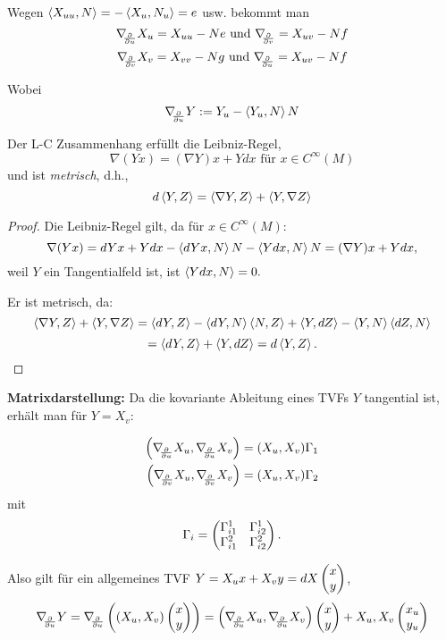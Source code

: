 \begin{remark}
	
	Wegen $ \left \langle X_{uu},N \right\rangle= -\left \langle X_u,N_u \right\rangle= e $ usw. bekommt man 
		\[ \nabla_{\!\!{\partial\over \partial u}}X_u = X_{uu}-Ne \text{ und } \nabla_{\!\!{\partial\over \partial v}} = X_{uv}-Nf \]
		\[ \nabla_{\!\!{\partial\over \partial v}}X_v = X_{vv}-Ng \text{ und } \nabla_{\!\!{\partial\over \partial u}} = X_{uv}-Nf \]
	
	Wobei $$ \nabla_{\!\!{\partial\over \partial u}}Y := Y_u - \left \langle Y_u,N \right\rangle N $$
	
\end{remark}

\begin{lemma}
	
	Der L-C Zusammenhang erfüllt die Leibniz-Regel,
		\[ \nabla(Yx) = (\nabla Y)x + Ydx \text{ für } x \in C^\infty(M) \] 
	und ist \emph{metrisch}, d.h., 
		\[ d\left \langle Y,Z \right\rangle = \left \langle \nabla Y,Z \right\rangle + \left \langle Y,\nabla Z \right\rangle \]
	
\end{lemma}

\begin{proof}
	
	Die Leibniz-Regel gilt, da für $x \in C^\infty(M)$:
		\[ \nabla(Yx) = dYx + Ydx- \left \langle dYx,N \right\rangle N - \left \langle Ydx,N \right\rangle N = (\nabla Y)x + Ydx, \]
	weil $ Y $ ein Tangentialfeld ist, ist $ \left \langle Ydx,N \right\rangle = 0. $ 
	
	Er ist metrisch, da:
		\[  \left \langle \nabla Y,Z \right\rangle + \left \langle Y,\nabla Z \right\rangle = \left \langle dY,Z \right\rangle -\left \langle dY,N \right\rangle\left \langle N,Z \right\rangle + \left \langle Y,dZ \right\rangle - \left \langle Y,N \right\rangle\left \langle dZ,N \right\rangle \]
		\[ = \left \langle dY,Z \right\rangle + \left \langle Y,dZ \right\rangle = d\left \langle Y,Z \right\rangle. \]
	
\end{proof}

\textbf{Matrixdarstellung:} Da die kovariante Ableitung eines TVFs $ Y $ tangential ist, erhält man für $ Y = X_v :$

\begin{equation} \label{Eq:Gamma}
\begin{split}
		 \left(\D{u}X_u,\D{u}X_v \right) &= (X_u,X_v)\Gamma_1  \\
		 \left(\D vX_u,\D vX_v \right) &= (X_u,X_v)\Gamma_2 
\end{split}
\end{equation} 
	mit 
		\[ \Gamma_i = \begin{pmatrix} \Gamma_{i1}^1 & \Gamma_{i2}^1 \\ \Gamma_{i1}^2 & \Gamma_{i2}^2 \end{pmatrix}. \]
		
	Also gilt für ein allgemeines TVF $ Y=X_ux+X_vy=dX\begin{pmatrix} x \\ y \end{pmatrix} $, 
		\[ \D{u}Y= \D{u}\left ( \left( X_u,X_v \right) \pmat{x \\y}    \right ) = \left( \D{u}X_u,\D{u}X_v \right) \pmat{x \\y} + X_u,X_v \pmat{x_u \\ y_u} \]

